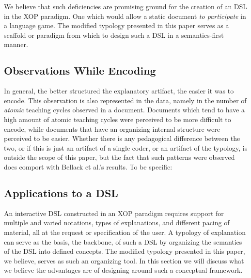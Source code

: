 \documentclass[conference]{IEEEtran}
\begin{document}
We believe that such deficiencies are promising ground for the creation of an
DSL in the XOP paradigm. One which would allow a static document \emph{to
  participate} in a language game. The modified typology presented in this
paper serves as a scaffold or paradigm from which to design such a DSL in a
semantics-first \cite{EW11sle} manner.

\subsection{Observations While Encoding}
In general, the better structured the explanatory artifact, the easier it was to
encode. This observation is also represented in the data, namely in the number
of \emph{atomic} teaching cycles observed in a document. Documents which tend to
have a high amount of atomic teaching cycles were perceived to be more difficult
to encode, while documents that have an organizing internal structure were
perceived to be easier. Whether there is any pedagogical difference between the
two, or if this is just an artifact of a single coder, or an artifact of the
typology, is outside the scope of this paper, but the fact that such patterns
were observed does comport with Bellack et al.'s results. To be specific:


\subsection{Applications to a DSL}
An interactive DSL constructed in an XOP paradigm requires support for multiple
and varied notations, types of explanations, and different pacing of material,
all at the request or specification of the user. A typology of explanation can
serve as the basis, the backbone, of such a DSL by organizing the semantics of
the DSL into defined concepts. The modified typology presented in this paper, we
believe, serves as such an organizing tool. In this section we will discuss what
we believe the advantages are of designing around such a conceptual framework.
\end{document}
